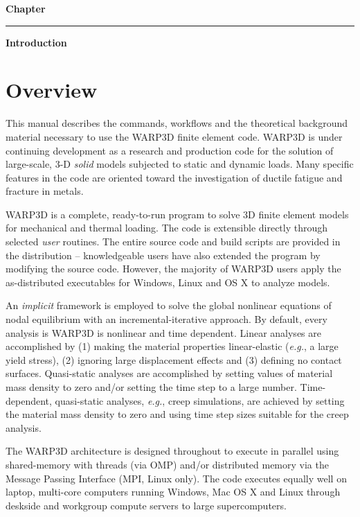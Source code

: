 \documentclass[11pt]{report}
\numberwithin{equation}{section}
\newcommand{\eg}{\emph{e.g.},\xspace}
\newcommand{\ti}{\emph}
\begin{document}
\LARGE
\hfill
\textbf{Chapter \thechapter}
\rule[0.15in]{450pt}{0.5mm}
\LARGE
\begin{flushright}
 \textbf{
{\selectfont Introduction}}
\end{flushright}
\normalsize

%
\section{Overview}
This manual describes the commands, workflows and the theoretical 
background material 
necessary to use the WARP3D finite element code. WARP3D 
is under continuing development as a research and production
code for the solution of large-scale, 3-D \ti{solid} models 
subjected to static and dynamic loads.  Many specific features in the code 
are oriented toward the investigation of ductile fatigue and
fracture in metals.

WARP3D is a complete, ready-to-run program to solve 3D finite element models
for mechanical and thermal loading. The code is extensible directly through
selected \ti{user} routines. The entire source code and build scripts are provided in
the distribution -- knowledgeable users have also extended the program by modifying the
source code. However, the majority of WARP3D users apply the as-distributed executables
for Windows, Linux and OS X to analyze models.

An \ti{implicit} framework is employed to solve the global nonlinear
equations of nodal equilibrium with an incremental-iterative 
approach. By default, every analysis is WARP3D is nonlinear and time dependent.
Linear analyses are accomplished by (1) making the material properties
linear-elastic (\eg a large yield stress), (2) ignoring large displacement
effects and (3) defining no contact surfaces. Quasi-static analyses are accomplished
by setting values of material mass density to zero and/or setting the time step
to a large number.  Time-dependent, quasi-static analyses, \eg creep simulations,
are achieved by setting the material mass density to zero and using time step sizes suitable
for the creep analysis.

The WARP3D architecture is designed throughout to execute in parallel
using shared-memory with threads (via OMP) and/or distributed
memory via the Message Passing Interface (MPI, Linux only). The code executes
equally well on laptop, multi-core computers running Windows, Mac
OS X and Linux through deskside and workgroup compute servers to
large supercomputers.
\end{document}
